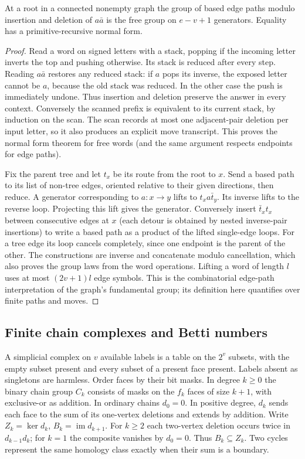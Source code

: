 \begin{theorem}\label{idx-algebraic56}
At a root in a connected nonempty graph the group of based edge paths
modulo insertion and deletion of $a\bar a$ is the free group on
$e-v+1$ generators. Equality has a primitive-recursive normal form.
\end{theorem}
\begin{proof}
Read a word on signed letters with a stack, popping if the incoming letter
inverts the top and pushing otherwise. Its stack is reduced after every
step. Reading $a\bar a$ restores any reduced stack: if $a$ pops its
inverse, the exposed letter cannot be $a$, because the old stack was
reduced. In the other case the push is immediately undone. Thus insertion
and deletion preserve the answer in every context. Conversely the scanned
prefix is equivalent to its current stack, by induction on the scan. The scan records at most one adjacent-pair deletion per input letter,
so it also produces an explicit move transcript. This
proves the normal form theorem for free words (and the same argument
respects endpoints for edge paths).

Fix the parent tree and let $t_x$ be its route from the root to $x$.
Send a based path to its list of non-tree edges, oriented relative to
their given directions, then reduce. A generator corresponding to
$a:x\to y$ lifts to $t_xa\bar t_y$. Its inverse lifts to the reverse
loop. Projecting this lift gives the generator. Conversely insert
$\bar t_x t_x$ between consecutive edges at $x$ (each detour is obtained by nested
inverse-pair insertions) to write a based path as
a product of the lifted single-edge loops. For a tree edge its loop
cancels completely, since one endpoint is the parent of the other.
The constructions are inverse and concatenate modulo cancellation, which
also proves the group laws from the word operations.
Lifting a word of length $l$ uses at most $(2v+1)l$ edge symbols.
This is the combinatorial edge-path interpretation of the graph's
fundamental group; its definition here quantifies over finite paths and
moves.
\end{proof}

\subsection{Finite chain complexes and Betti numbers}
A simplicial complex on $v$ available labels is a table on the $2^v$
subsets, with the empty subset present and every subset of a present face
present. Labels absent as singletons are harmless. Order faces by their
bit masks. In degree $k\ge0$ the binary chain group $C_k$ consists of
masks on the $f_k$ faces of size $k+1$, with exclusive-or as addition.
In ordinary chains $d_0=0$. In positive degree, $d_k$ sends each face to
the sum of its one-vertex deletions and extends by addition. Write
$Z_k=\ker d_k$, $B_k=\operatorname{im}d_{k+1}$. For $k\ge2$ each
two-vertex deletion occurs twice in $d_{k-1}d_k$; for $k=1$ the
composite vanishes by $d_0=0$. Thus $B_k\subseteq Z_k$. Two cycles
represent the same homology class exactly when their sum is a boundary.

